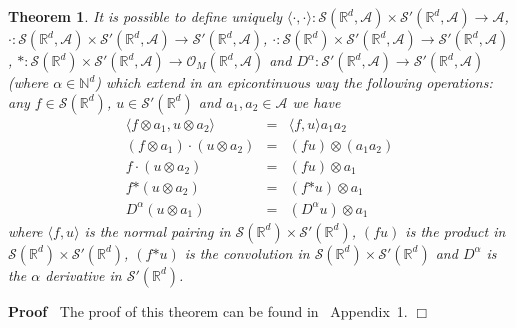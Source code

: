 \documentclass{article}
\newcommand{\asterisk}{\mathord{*}}
\newenvironment{proof}{\noindent\textbf{Proof\ }}{\hspace*{\fill}$\Box$\medskip}
\newtheorem{theorem}{Theorem}
\begin{document}
\begin{theorem}
  It is possible to define uniquely $\langle \cdot, \cdot \rangle :
  \mathcal{S} (\mathbb{R}^d, \mathcal{A}) \times \mathcal{S}' (\mathbb{R}^d,
  \mathcal{A}) \rightarrow \mathcal{A}$, $\cdot : \mathcal{S} (\mathbb{R}^d,
  \mathcal{A}) \times \mathcal{S}' (\mathbb{R}^d, \mathcal{A}) \rightarrow
  \mathcal{S}' (\mathbb{R}^d, \mathcal{A})$, $\cdot : \mathcal{S}
  (\mathbb{R}^d) \times \mathcal{S}' (\mathbb{R}^d, \mathcal{A}) \rightarrow
  \mathcal{S}' (\mathbb{R}^d, \mathcal{A})$, $\asterisk : \mathcal{S}
  (\mathbb{R}^d) \times \mathcal{S}' (\mathbb{R}^d, \mathcal{A}) \rightarrow
  \mathcal{O}_M (\mathbb{R}^d, \mathcal{A})$ and $D^{\alpha} : \mathcal{S}'
  (\mathbb{R}^d, \mathcal{A}) \rightarrow \mathcal{S}' (\mathbb{R}^d,
  \mathcal{A})$ (where $\alpha \in \mathbb{N}^d$) which extend in an
  epicontinuous way the following operations: any $f \in \mathcal{S}
  (\mathbb{R}^d)$, $u \in \mathcal{S}' (\mathbb{R}^d)$ and $a_1, a_2 \in
  \mathcal{A}$ we have
  \[ \begin{array}{rll}
       \langle f \otimes a_1, u \otimes a_2 \rangle & = & \langle f, u \rangle
       a_1 a_2\\
       (f \otimes a_1) \cdot (u \otimes a_2) & = & (f u) \otimes (a_1 a_2)\\
       f \cdot (u \otimes a_2) & = & (f u) \otimes a_1\\
       f \asterisk (u \otimes a_2) & = & (f \asterisk u) \otimes a_1\\
       D^{\alpha} (u \otimes a_1) & = & (D^{\alpha} u) \otimes a_1
     \end{array} \]
  where $\langle f, u \rangle$ is the normal pairing in $\mathcal{S}
  (\mathbb{R}^d) \times \mathcal{S}' (\mathbb{R}^d)$, $(f u)$ is the product
  in $\mathcal{S} (\mathbb{R}^d) \times \mathcal{S}' (\mathbb{R}^d)$, $(f
  \asterisk u)$ is the convolution in $\mathcal{S} (\mathbb{R}^d) \times
  \mathcal{S}' (\mathbb{R}^d)$ and $D^{\alpha}$ is the $\alpha$ derivative in
  $\mathcal{S}' (\mathbb{R}^d)$.
\end{theorem}

\begin{proof}
  The proof of this theorem can be found in~{\cite{Amann2019}} Appendix~1.
\end{proof}
\end{document}
